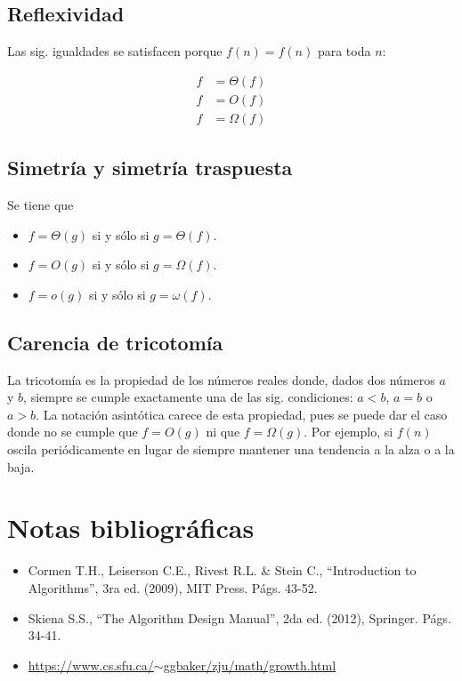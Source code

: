 \subsection{Reflexividad}

Las sig. igualdades se satisfacen porque $f(n)=f(n)$ para toda $n$:

\[
\begin{aligned}f & =\Theta(f)\\
f & =O(f)\\
f & =\Omega(f)
\end{aligned}
\]


\subsection{Simetría y simetría traspuesta}

Se tiene que
\begin{itemize}
\item $f=\Theta(g)$ si y sólo si $g=\Theta(f)$.
\item $f=O(g)$ si y sólo si $g=\Omega(f)$.
\item $f=o(g)$ si y sólo si $g=\omega(f)$.
\end{itemize}

\subsection{Carencia de tricotomía}

La tricotomía es la propiedad de los números reales donde, dados dos
números $a$ y $b$, siempre se cumple exactamente una de las sig.
condiciones: $a<b$, $a=b$ o $a>b$. La notación asintótica carece
de esta propiedad, pues\emph{ }se puede dar el caso donde no se cumple
que $f=O(g)$ ni que $f=\Omega(g)$. Por ejemplo, si $f(n)$ oscila
periódicamente en lugar de siempre mantener una tendencia a la alza
o a la baja.

\section*{Notas bibliográficas}
\begin{itemize}
\item Cormen T.H., Leiserson C.E., Rivest R.L. \& Stein C., ``Introduction
to Algorithms'', 3ra ed. (2009), MIT Press. Págs. 43-52.
\item Skiena S.S., ``The Algorithm Design Manual'', 2da ed. (2012), Springer.
Págs. 34-41.
\item \href{https://www.cs.sfu.ca/~ggbaker/zju/math/growth.html}{https://www.cs.sfu.ca/$\sim$ggbaker/zju/math/growth.html}
\end{itemize}

